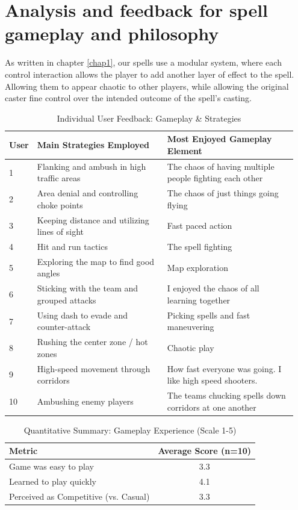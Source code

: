 \documentclass[12pt,a4paper]{report}
\begin{document}
\section{Analysis and feedback for spell gameplay and philosophy}

As written in chapter \ref{chap1}, our spells use a modular system, where each control interaction allows the player to add another layer of effect to the spell. Allowing them to appear chaotic to other players, while allowing the original caster fine control over the intended outcome of the spell's casting.

\begin{table}[H]
\centering
\caption{Individual User Feedback: Gameplay \& Strategies}
\label{tab:gameplay1}
\begin{tabular}{p{0.05\linewidth} p{0.45\linewidth} p{0.45\linewidth}}
\hline
\textbf{User} & \textbf{Main Strategies Employed} & \textbf{Most Enjoyed Gameplay Element} \\
\hline
1 & Flanking and ambush in high traffic areas & The chaos of having multiple people fighting each other \\
2 & Area denial and controlling choke points & The chaos of just things going flying \\
3 & Keeping distance and utilizing lines of sight & Fast paced action \\
4 & Hit and run tactics & The spell fighting \\
5 & Exploring the map to find good angles & Map exploration \\
6 & Sticking with the team and grouped attacks & I enjoyed the chaos of all learning together \\
7 & Using dash to evade and counter-attack & Picking spells and fast maneuvering \\
8 & Rushing the center zone / hot zones & Chaotic play \\
9 & High-speed movement through corridors & How fast everyone was going. I like high speed shooters. \\
10 & Ambushing enemy players & The teams chucking spells down corridors at one another \\
\hline
\end{tabular}
\end{table}

\begin{table}[H]
\centering
\caption{Quantitative Summary: Gameplay Experience (Scale 1-5)}
\label{tab:gameplay2}
\begin{tabular}{l c}
\hline
\textbf{Metric} & \textbf{Average Score (n=10)} \\
\hline
Game was easy to play & 3.3 \\
Learned to play quickly & 4.1 \\
Perceived as Competitive (vs. Casual) & 3.3 \\
\hline
\end{tabular}
\end{table}
\end{document}
